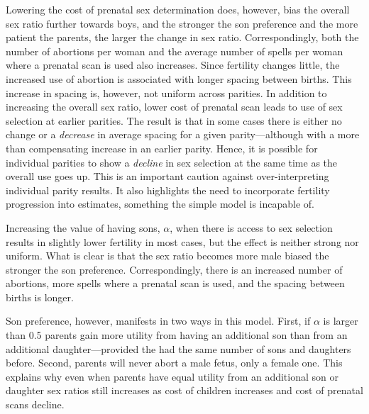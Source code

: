 \documentclass[12pt,letterpaper]{article}
\begin{document}
Lowering the cost of prenatal sex determination does, however, bias the overall sex 
ratio further towards boys, and the stronger the son preference and the 
more patient the parents, the larger the change in sex ratio.
Correspondingly, both the number of abortions per woman and the
average number of spells per woman where a prenatal scan is used also increases.
Since fertility changes little, the increased use of abortion
is associated with longer spacing between births.
This increase in spacing is, however, not uniform across parities.
In addition to increasing the overall sex ratio, lower cost of prenatal 
scan leads to use of sex selection at earlier parities.
The result is that in some cases there is either no change or a \emph{decrease} 
in average spacing for a given parity---although with a more than compensating 
increase in an earlier parity.
Hence, it is possible for individual parities to show a \emph{decline}
in sex selection at the same time as the overall use goes up.
This is an important caution against over-interpreting
individual parity results.
It also highlights the need to incorporate fertility progression into
estimates, something the simple model is incapable of.



Increasing the value of having sons, $\alpha$, when there is access to 
sex selection results in slightly lower fertility in most cases,
but the effect is neither strong nor uniform.
What is clear is that the sex ratio becomes more male biased 
the stronger the son preference.
Correspondingly, there is an increased number of abortions,
more spells where a prenatal scan is used,
and the spacing between births is longer.

Son preference, however, manifests in two ways in this model.
First, if $\alpha$ is larger than 0.5 parents gain more utility
from having an additional son than from an additional daughter---provided
the had the same number of sons and daughters before.
Second, parents will never abort a male fetus, only a female one.
This explains why even when parents have equal utility from an additional
son or daughter sex ratios still increases as cost of children 
increases and cost of prenatal scans decline.
\end{document}
